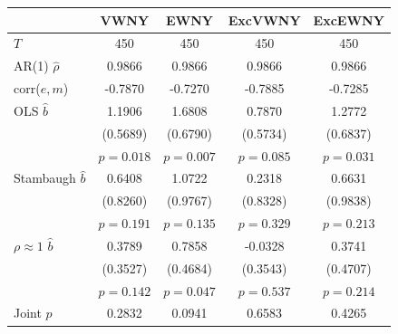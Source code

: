\begin{tabular}{lcccc}
\toprule
 & VWNY & EWNY & ExcVWNY & ExcEWNY \\
\midrule
$T$ & 450 & 450 & 450 & 450 \\
AR(1) $\hat\rho$ & 0.9866 & 0.9866 & 0.9866 & 0.9866 \\
corr($e,m$) & -0.7870 & -0.7270 & -0.7885 & -0.7285 \\
\midrule
OLS $\hat b$ & 1.1906 & 1.6808 & 0.7870 & 1.2772 \\
 & (0.5689) & (0.6790) & (0.5734) & (0.6837) \\
 & $p=0.018$ & $p=0.007$ & $p=0.085$ & $p=0.031$ \\
Stambaugh $\hat b$ & 0.6408 & 1.0722 & 0.2318 & 0.6631 \\
 & (0.8260) & (0.9767) & (0.8328) & (0.9838) \\
 & $p=0.191$ & $p=0.135$ & $p=0.329$ & $p=0.213$ \\
$\rho\approx1$ $\hat b$ & 0.3789 & 0.7858 & -0.0328 & 0.3741 \\
 & (0.3527) & (0.4684) & (0.3543) & (0.4707) \\
 & $p=0.142$ & $p=0.047$ & $p=0.537$ & $p=0.214$ \\
\midrule
Joint $p$ & 0.2832 & 0.0941 & 0.6583 & 0.4265 \\
\bottomrule
\end{tabular}
